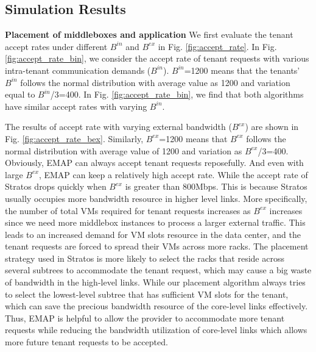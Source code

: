 \documentclass[review]{elsarticle}
\begin{document}
\subsection{Simulation Results}
\textbf{Placement of middleboxes and application} We first evaluate the tenant accept rates under different $B^{in}$ and $B^{ex}$ in Fig. \ref{fig:accept_rate}.
In Fig. \ref{fig:accept_rate_bin}, we consider 
the accept rate of tenant requests with various intra-tenant communication demands ($B^{in}$). $B^{in}$=1200 means that the tenants’ $B^{in}$ follows the normal distribution with average value as 1200 and variation equal to $B^{in}$/3=400. In Fig. \ref{fig:accept_rate_bin}, we find that both algorithms have similar accept rates with varying $B^{in}$. 


The results of accept rate with varying external bandwidth ($B^{ex}$) are shown in Fig. \ref{fig:accept_rate_bex}. Similarly, $B^{ex}$=1200 means that $B^{ex}$ follows the normal distribution with average value of 1200 and variation as $B^{ex}$/3=400. Obviously, EMAP can always accept tenant requests reposefully. And even with large $B^{ex}$, EMAP can keep a relatively high accept rate. While the accept rate of Stratos drops quickly when $B^{ex}$ is greater than 800Mbps. This is because Stratos usually occupies more bandwidth resource in higher level links. More specifically, the number of total VMs required for tenant requests increases as $B^{ex}$ increases since we need more middlebox instances to process a larger external traffic. This leads to an increased demand for VM slots resource in the data center, and the tenant requests are forced to spread their VMs across more racks. The placement strategy used in Stratos is more likely to select the racks that reside across several subtrees to accommodate the tenant request, which may cause a big waste of bandwidth in the high-level links. While our placement algorithm always tries to select the lowest-level subtree that has sufficient VM slots for the tenant, which can save the precious bandwidth resource of the core-level links effectively. Thus, EMAP is helpful to allow the provider to accommodate more tenant requests while reducing the bandwidth utilization of core-level links which allows more future tenant requests to be accepted.
\end{document}
